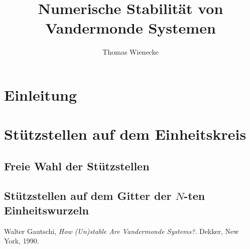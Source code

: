 \documentclass[a4paper, 11pt]{scrreprt}
\title{Numerische Stabilität von Vandermonde Systemen}
\author{Thomas Wienecke}
\begin{document}
\maketitle
\tableofcontents

\chapter{Einleitung}







\chapter{Stützstellen auf dem Einheitskreis}
\section{Freie Wahl der Stützstellen}
\section{Stützstellen auf dem Gitter der $N$-ten Einheitswurzeln}

\begin{thebibliography}{9}
    Walter Gautschi,
    \emph{How (Un)stable Are Vandermonde Systems?}.
    Dekker, New York,
    1990.
\end{thebibliography}
\end{document}
